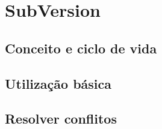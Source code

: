 \section{SubVersion}
\subsection{Conceito e ciclo de vida}
\subsection{Utilização básica}
\subsection{Resolver conflitos}
